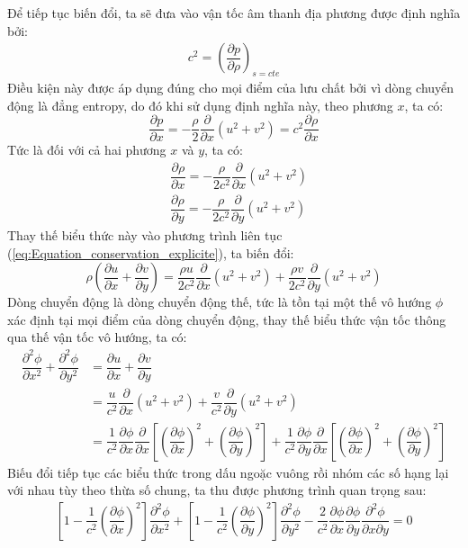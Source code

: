 \documentclass[../../DONG_CHAY_NEN_DUOC.tex]{subfiles}
\begin{document}
Để tiếp tục biến đổi, ta sẽ đưa vào vận tốc âm thanh địa phương được định nghĩa bởi:
	\begin{align}
		c^2=\left(\dfrac{\partial p}{\partial\rho}\right)_{s=cte}
	\end{align}
Điều kiện này được áp dụng đúng cho mọi điểm của lưu chất bởi vì dòng chuyển động là đẳng entropy, do đó khi sử dụng định nghĩa này, theo phương $x$, ta có:
	\[
		\dfrac{\partial p}{\partial x}=-\dfrac{\rho}{2}\dfrac{\partial}{\partial x}\left(u^2+v^2\right)=c^2\dfrac{\partial\rho}{\partial x}
	\]
Tức là đối với cả hai phương $x$ và $y$, ta có:
	\begin{align}
		&\dfrac{\partial\rho}{\partial x}=-\dfrac{\rho}{2c^2}\dfrac{\partial}{\partial x}\left(u^2+v^2\right)\\
		&\dfrac{\partial\rho}{\partial y}=-\dfrac{\rho}{2c^2}\dfrac{\partial}{\partial y}\left(u^2+v^2\right)
	\end{align}
Thay thế biểu thức này vào phương trình liên tục (\ref{eq:Equation_conservation_explicite}), ta biến đổi:
	\[
		\rho\left(\dfrac{\partial u}{\partial x}+\dfrac{\partial v}{\partial y}\right)=\dfrac{\rho u}{2c^2}\dfrac{\partial}{\partial x}\left(u^2+v^2\right)+\dfrac{\rho v}{2c^2}\dfrac{\partial}{\partial y}\left(u^2+v^2\right)
	\]
Dòng chuyển động là dòng chuyển động thế, tức là tồn tại một thế vô hướng $\phi$ xác định tại mọi điểm của dòng chuyển động, thay thế biểu thức vận tốc thông qua thế vận tốc vô hướng, ta có:
	\[
		\begin{aligned}
			\dfrac{\partial^2\phi}{\partial x^2}+\dfrac{\partial^2\phi}{\partial y^2}&=\dfrac{\partial u}{\partial x}+\dfrac{\partial v}{\partial y}\\
			&=\dfrac{u}{c^2}\dfrac{\partial}{\partial x}\left(u^2+v^2\right)+\dfrac{v}{c^2}\dfrac{\partial}{\partial y}\left(u^2+v^2\right)\\
			&=\dfrac{1}{c^2}\dfrac{\partial\phi}{\partial x}\dfrac{\partial}{\partial x}\left[\left(\dfrac{\partial\phi}{\partial x}\right)^2+\left(\dfrac{\partial\phi}{\partial y}\right)^2\right]+\dfrac{1}{c^2}\dfrac{\partial\phi}{\partial y}\dfrac{\partial}{\partial x}\left[\left(\dfrac{\partial\phi}{\partial x}\right)^2+\left(\dfrac{\partial\phi}{\partial y}\right)^2\right]
		\end{aligned}
	\]
Biếu đổi tiếp tục các biểu thức trong dấu ngoặc vuông rồi nhóm các số hạng lại với nhau tùy theo thừa số chung, ta thu được phương trình quan trọng sau:
	\begin{equation}\label{eq:compressible_velocity_potential}
		\boxed{
			\begin{aligned}
				\left[1-\dfrac{1}{c^2}\left(\dfrac{\partial\phi}{\partial x}\right)^2\right]\dfrac{\partial^2\phi}{\partial x^2}+\left[1-\dfrac{1}{c^2}\left(\dfrac{\partial\phi}{\partial y}\right)^2\right]\dfrac{\partial^2\phi}{\partial y^2}-\dfrac{2}{c^2}\dfrac{\partial\phi}{\partial x}\dfrac{\partial\phi}{\partial y}\dfrac{\partial^2\phi}{\partial x\partial y}=0
			\end{aligned}
			}
	\end{equation}
\end{document}
